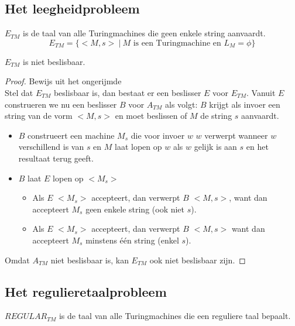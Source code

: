 \documentclass[main.tex]{subfiles}
\begin{document}
\subsection{Het leegheidprobleem}


\begin{de}
  \label{de:e-tm}
  $E_{TM}$ is de taal van alle Turingmachines die geen enkele string aanvaardt.
  \[ E_{TM} = \{ <M,s>\ |\ M \text{ is een Turingmachine en } L_{M} = \phi \} \]
\end{de}

\begin{st}
  \label{st:e-tm-niet-besl}
  $E_{TM}$ is niet beslisbaar.

  \begin{proof}
    Bewijs uit het ongerijmde\\
    Stel dat $E_{TM}$ beslisbaar is, dan bestaat er een beslisser $E$ voor $E_{TM}$.
    Vanuit $E$ construeren we nu een beslisser $B$ voor $A_{TM}$ als volgt:
    $B$ krijgt als invoer een string van de vorm $<M,s>$ en moet beslissen of $M$ de string $s$ aanvaardt.
    \begin{itemize}
    \item $B$ construeert een machine $M_{s}$ die voor invoer $w$ $w$ verwerpt wanneer $w$ verschillend is van $s$ en $M$ laat lopen op $w$ als $w$ gelijk is aan $s$ en het resultaat terug geeft.
    \item $B$ laat $E$ lopen op $<M_{s}>$
      \begin{itemize}
      \item Als $E$ $<M_{s}>$ accepteert, dan verwerpt $B$ $<M,s>$, want dan accepteert $M_{s}$ geen enkele string (ook niet $s$).
      \item Als $E$ $<M_{s}>$ accepteert, dan verwerpt $B$ $<M,s>$ want dan accepteert $M_{s}$ minstens \'e\'en string (enkel $s$).
      \end{itemize}
    \end{itemize}
    Omdat $A_{TM}$ niet beslisbaar is, kan $E_{TM}$ ook niet beslisbaar zijn.
  \end{proof}
\end{st}

\subsection{Het regulieretaalprobleem}


\begin{de}
  \label{de:regular-tm}
  $REGULAR_{TM}$ is de taal van alle Turingmachines die een reguliere taal bepaalt.
\end{de}
\end{document}
